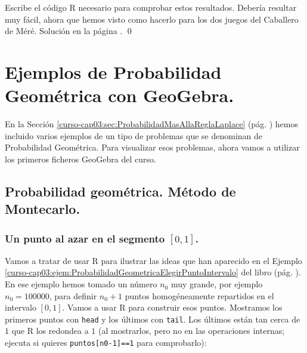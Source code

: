 \documentclass[10pt,a4paper]{article}\usepackage[]{graphicx}\usepackage[]{color}
\begin{document}
\begin{ejercicio}
\label{tut03:ejercicio12}
\quad
Escribe el código R necesario para comprobar estos resultados. Debería resultar muy fácil, ahora que hemos visto como hacerlo para los dos juegos del Caballero de Méré.
Solución en la página \pageref{tut03:ejercicio12:sol}.
\qed
\end{ejercicio}


\section{Ejemplos de Probabilidad Geométrica con GeoGebra.}
\label{tut03:sec:EjemplosProbabilidadGeometricaGeoGebra}

En la Sección \ref{curso-cap03:sec:ProbabilidadMasAllaReglaLaplace} (pág. \pageref{curso-cap03:sec:ProbabilidadMasAllaReglaLaplace}) hemos incluido varios ejemplos de un tipo de problemas que se denominan de Probabilidad Geométrica. Para visualizar esos problemas, ahora vamos a utilizar los primeros ficheros GeoGebra del curso.

\subsection{Probabilidad geométrica. Método de Montecarlo.}

\subsubsection{Un punto al azar en el segmento $[0,1]$.}

Vamos a tratar de usar R para ilustrar las ideas que han aparecido en el Ejemplo \ref{curso-cap03:ejem:ProbabilidadGeometricaElegirPuntoIntervalo} del libro (pág. \pageref{curso-cap03:ejem:ProbabilidadGeometricaElegirPuntoIntervalo}). En ese ejemplo hemos tomado un número $n_0$ muy grande, por ejemplo $n_0=100000$, para definir $n_0+1$ puntos homogéneamente repartidos en el intervalo $[0,1]$. Vamos a usar R para construir esos puntos. Mostramos los primeros puntos con {\tt head} y los últimos con {\tt tail}. Los últimos están tan cerca de $1$ que R los redondea a $1$ (al mostrarlos, pero no en las operaciones internas; ejecuta si quieres {\tt puntos[n0-1]==1} para comprobarlo):
\end{document}
